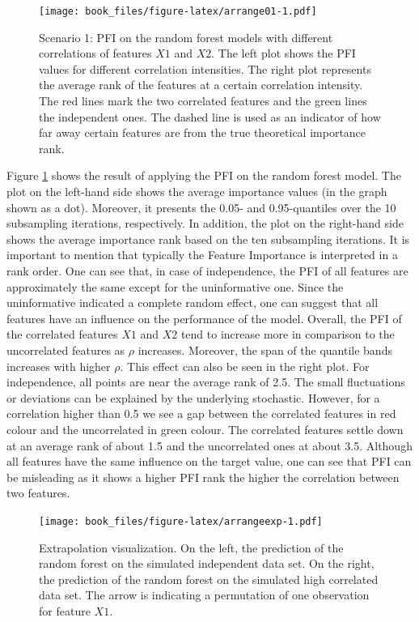 \documentclass[
]{krantz}
\begin{document}
\begin{figure}
\centering
\texttt{[image: book\_files/figure-latex/arrange01-1.pdf]}
\caption{\label{fig:arrange01}Scenario 1: PFI on the random forest models with different correlations of features \(X1\) and \(X2\). The left plot shows the PFI values for different correlation intensities. The right plot represents the average rank of the features at a certain correlation intensity. The red lines mark the two correlated features and the green lines the independent ones. The dashed line is used as an indicator of how far away certain features are from the true theoretical importance rank.}
\end{figure}

Figure \ref{fig:arrange01} shows the result of applying the PFI on the random forest model. The plot on the left-hand side shows the average importance values (in the graph shown as a dot). Moreover, it presents the 0.05- and 0.95-quantiles over the 10 subsampling iterations, respectively. In addition, the plot on the right-hand side shows the average importance rank based on the ten subsampling iterations. It is important to mention that typically the Feature Importance is interpreted in a rank order. One can see that, in case of independence, the PFI of all features are approximately the same except for the uninformative one. Since the uninformative indicated a complete random effect, one can suggest that all features have an influence on the performance of the model. Overall, the PFI of the correlated features \(X1\) and \(X2\) tend to increase more in comparison to the uncorrelated features as \(\rho\) increases. Moreover, the span of the quantile bands increases with higher \(\rho\). This effect can also be seen in the right plot. For independence, all points are near the average rank of 2.5. The small fluctuations or deviations can be explained by the underlying stochastic. However, for a correlation higher than 0.5 we see a gap between the correlated features in red colour and the uncorrelated in green colour. The correlated features settle down at an average rank of about 1.5 and the uncorrelated ones at about 3.5. Although all features have the same influence on the target value, one can see that PFI can be misleading as it shows a higher PFI rank the higher the correlation between two features.

\begin{figure}
\centering
\texttt{[image: book\_files/figure-latex/arrangeexp-1.pdf]}
\caption{\label{fig:arrangeexp}Extrapolation visualization. On the left, the prediction of the random forest on the simulated independent data set. On the right, the prediction of the random forest on the simulated high correlated data set. The arrow is indicating a permutation of one observation for feature \(X1\).}
\end{figure}
\end{document}
